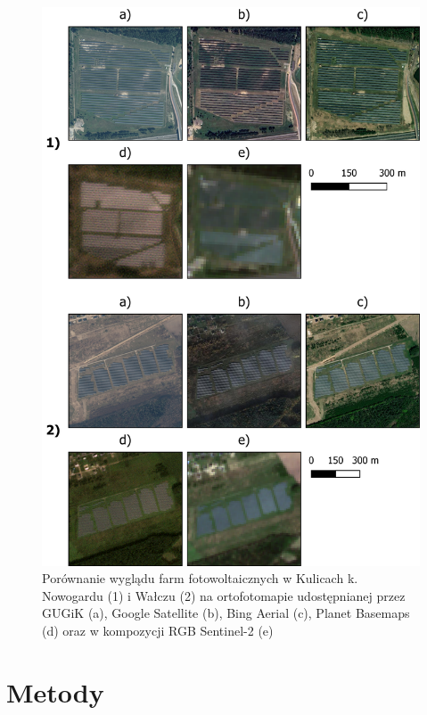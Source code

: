 \documentclass{amuthesis}
\begin{document}
\begin{figure}[t]

{\centering \includegraphics[width=1\textwidth,height=\textheight]{figures/pv.png}

}

\caption{\label{fig-rycina-pv}Porównanie wyglądu farm fotowoltaicznych w
Kulicach k. Nowogardu (1) i Wałczu (2) na ortofotomapie udostępnianej
przez GUGiK (a), Google Satellite (b), Bing Aerial (c), Planet Basemaps
(d) oraz w kompozycji RGB Sentinel-2 (e)}

\end{figure}


\hypertarget{sec-metody}{%
\chapter{Metody}\label{sec-metody}}
\end{document}
